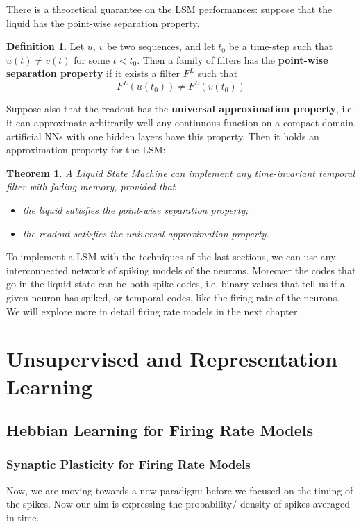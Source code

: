 \documentclass[oneside]{book}
\theoremstyle{definition}
\newtheorem{defn}{Definition}
\theoremstyle{plain}
\newtheorem{teo}{Theorem}
\begin{document}
There is a theoretical guarantee on the LSM performances: suppose that the liquid has the point-wise separation property.
\begin{defn}
    Let $u$, $v$ be two sequences, and let $t_0$ be a time-step such that $u(t)\neq v(t)$ for some $t<t_0$. 
    Then a family of filters has the \textbf{point-wise separation property} if it exists a filter $F^L$ such that
    \[
        F^L(u(t_0))\neq F^L(v(t_0))
    \]
\end{defn}
Suppose also that the readout has the \textbf{universal approximation property}, i.e. it can approximate arbitrarily well any continuous function on a compact domain. artificial NNs with one hidden layers have this property.
Then it holds an approximation property for the LSM:
\begin{teo}
    A Liquid State Machine can implement any time-invariant temporal
filter with fading memory, provided that
\begin{itemize}
    \item the liquid satisfies the point-wise separation property;
    \item the readout satisfies the universal approximation property.
\end{itemize}
\end{teo}

To implement a LSM with the techniques of the last sections, we can use any interconnected network of spiking models of the neurons. Moreover the codes that go in the liquid state can be both spike codes, i.e. binary values that tell us if a given neuron has spiked, or temporal codes, like the firing rate of the neurons.
We will explore more in detail firing rate models in  the next chapter.
\chapter{Unsupervised and Representation Learning}

\section{Hebbian Learning for Firing Rate Models}
\subsection{Synaptic Plasticity for Firing Rate Models}
Now, we are moving towards a new paradigm: before we focused on the timing of the spikes. Now our aim is expressing the probability/ density of spikes averaged in time.
\end{document}
